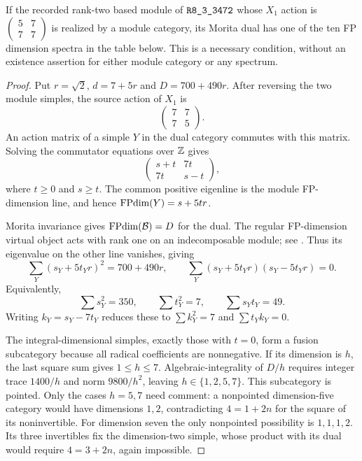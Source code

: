 \begin{proposition}
\label{prop:research-r3472-ten-spectra}
If the recorded rank-two based module of $\sha{R8_3_3472}$ whose
$X_1$ action is $\left(\begin{smallmatrix}5&7\\7&7\end{smallmatrix}\right)$
is realized by a module category, its Morita dual
has one of the ten FP dimension spectra in the table below.
This is a necessary condition, without an existence assertion for
either module category or any spectrum.
\end{proposition}
\begin{proof}
Put $r=\sqrt2$, $d=7+5r$ and $D=700+490r$.
After reversing the two module simples, the source action of $X_1$
is
\[
 \begin{pmatrix}7&7\\7&5\end{pmatrix}.
\]
An action matrix of a simple $Y$ in the dual category commutes with
this matrix.  Solving the commutator equations over $\mathbb Z$ gives
\[
 \begin{pmatrix}s+t&7t\\7t&s-t\end{pmatrix},
\]
where $t\geq0$ and $s\geq t$.
The common positive eigenline is the module FP-dimension line,
and hence $\operatorname{FPdim}(Y)=s+5tr$.

Morita invariance gives $\operatorname{FPdim}(\mathcal B)=D$ for the dual.
The regular FP-dimension virtual object acts with rank one on an
indecomposable module; see \cite[Exercise~7.16.8]{EGNO}.
Thus its eigenvalue on the other line vanishes, giving
\[
 \sum_Y(s_Y+5t_Yr)^2=700+490r,
 \qquad \sum_Y(s_Y+5t_Yr)(s_Y-5t_Yr)=0.
\]
Equivalently,
\[
 \sum s_Y^2=350,\qquad\sum t_Y^2=7,
 \qquad\sum s_Yt_Y=49.
\]
Writing $k_Y=s_Y-7t_Y$ reduces these to
$\sum k_Y^2=7$ and $\sum t_Yk_Y=0$.

The integral-dimensional simples, exactly those with $t=0$, form
a fusion subcategory because all radical coefficients are
nonnegative.  If its dimension is $h$, the last square sum gives
$1\leq h\leq7$.  Algebraic-integrality of $D/h$
\cite[Theorem~7.17.6]{EGNO} requires integer trace $1400/h$
and norm $9800/h^2$, leaving $h\in\{1,2,5,7\}$.
This subcategory is pointed.  Only the cases $h=5,7$ need comment:
a nonpointed dimension-five category would have dimensions $1,2$,
contradicting $4=1+2n$ for the square of its noninvertible.
For dimension seven the only nonpointed possibility is $1,1,1,2$.
Its three invertibles fix the dimension-two simple, whose product
with its dual would require $4=3+2n$, again impossible.


\end{proof}
